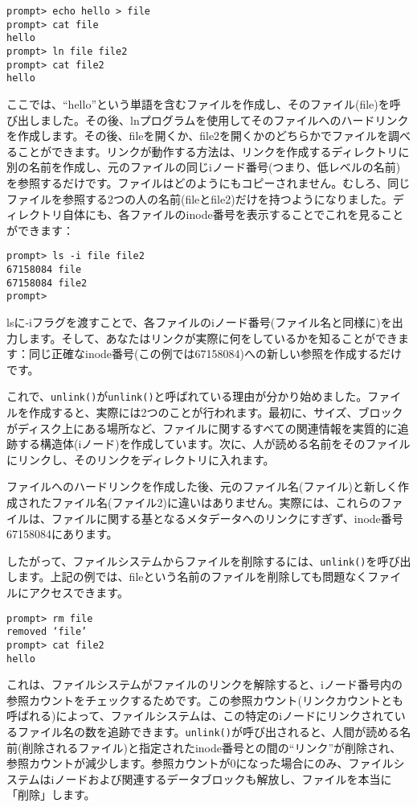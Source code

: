\begin{verbatim}
prompt> echo hello > file
prompt> cat file
hello
prompt> ln file file2
prompt> cat file2
hello
\end{verbatim}

ここでは、``hello''という単語を含むファイルを作成し、そのファイル(file)を呼び出しました。その後、lnプログラムを使用してそのファイルへのハードリンクを作成します。その後、fileを開くか、file2を開くかのどちらかでファイルを調べることができます。リンクが動作する方法は、リンクを作成するディレクトリに別の名前を作成し、元のファイルの同じiノード番号(つまり、低レベルの名前)を参照するだけです。ファイルはどのようにもコピーされません。むしろ、同じファイルを参照する2つの人の名前(fileとfile2)だけを持つようになりました。ディレクトリ自体にも、各ファイルのinode番号を表示することでこれを見ることができます：

\begin{verbatim}
prompt> ls -i file file2
67158084 file
67158084 file2
prompt>
\end{verbatim}

lsに-iフラグを渡すことで、各ファイルのiノード番号(ファイル名と同様に)を出力します。そして、あなたはリンクが実際に何をしているかを知ることができます：同じ正確なinode番号(この例では67158084)への新しい参照を作成するだけです。

これで、\texttt{unlink()}が\texttt{unlink()}と呼ばれている理由が分かり始めました。ファイルを作成すると、実際には2つのことが行われます。最初に、サイズ、ブロックがディスク上にある場所など、ファイルに関するすべての関連情報を実質的に追跡する構造体(iノード)を作成しています。次に、人が読める名前をそのファイルにリンクし、そのリンクをディレクトリに入れます。

ファイルへのハードリンクを作成した後、元のファイル名(ファイル)と新しく作成されたファイル名(ファイル2)に違いはありません。実際には、これらのファイルは、ファイルに関する基となるメタデータへのリンクにすぎず、inode番号67158084にあります。

したがって、ファイルシステムからファイルを削除するには、\texttt{unlink()}を呼び出します。上記の例では、fileという名前のファイルを削除しても問題なくファイルにアクセスできます。

\begin{verbatim}
prompt> rm file
removed ‘file’
prompt> cat file2
hello
\end{verbatim}

これは、ファイルシステムがファイルのリンクを解除すると、iノード番号内の参照カウントをチェックするためです。この参照カウント(リンクカウントとも呼ばれる)によって、ファイルシステムは、この特定のiノードにリンクされているファイル名の数を追跡できます。\texttt{unlink()}が呼び出されると、人間が読める名前(削除されるファイル)と指定されたinode番号との間の``リンク''が削除され、参照カウントが減少します。参照カウントが0になった場合にのみ、ファイルシステムはiノードおよび関連するデータブロックも解放し、ファイルを本当に「削除」します。

